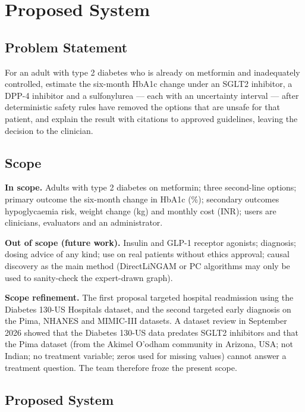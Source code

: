 \chapter{Proposed System}\label{chap3}
\newpage
\section{Problem Statement}
For an adult with type 2 diabetes who is already on metformin and inadequately controlled, estimate the six-month HbA1c change under an SGLT2 inhibitor, a DPP-4 inhibitor and a sulfonylurea --- each with an uncertainty interval --- after deterministic safety rules have removed the options that are unsafe for that patient, and explain the result with citations to approved guidelines, leaving the decision to the clinician.

\section{Scope}
\textbf{In scope.} Adults with type 2 diabetes on metformin; three second-line options; primary outcome the six-month change in HbA1c (\%); secondary outcomes hypoglycaemia risk, weight change (kg) and monthly cost (INR); users are clinicians, evaluators and an administrator.

\textbf{Out of scope (future work).} Insulin and GLP-1 receptor agonists; diagnosis; dosing advice of any kind; use on real patients without ethics approval; causal discovery as the main method (DirectLiNGAM or PC algorithms may only be used to sanity-check the expert-drawn graph).

\textbf{Scope refinement.} The first proposal targeted hospital readmission using the Diabetes 130-US Hospitals dataset, and the second targeted early diagnosis on the Pima, NHANES and MIMIC-III datasets. A dataset review in September 2026 showed that the Diabetes 130-US data predates SGLT2 inhibitors and that the Pima dataset (from the Akimel O'odham community in Arizona, USA; not Indian; no treatment variable; zeros used for missing values) cannot answer a treatment question. The team therefore froze the present scope.

\section{Proposed System}
